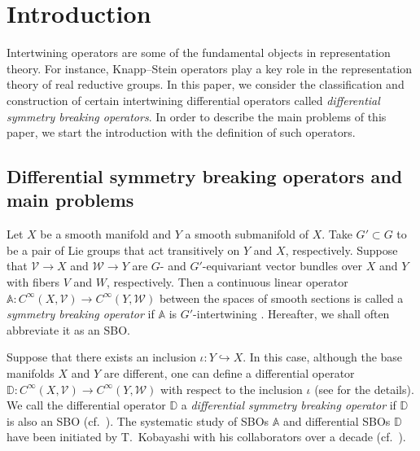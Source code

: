 \documentclass[reqno,11pt]{amsart}
\theoremstyle{remark}
\theoremstyle{definition}
\numberwithin{equation}{section}
\newcommand{\bD}{\mathbb{D}}
\newcommand{\bA}{\mathbb{A}}
\begin{document}
\setcounter{tocdepth}{1}
\tableofcontents


\section{Introduction}
\label{sec:intro}


Intertwining operators are some of the fundamental objects in representation theory. For instance, Knapp--Stein operators play a key role in the representation theory of real reductive groups. In this paper,  we consider the classification and 
construction of
certain intertwining differential operators called 
\emph{differential symmetry breaking operators}.
In order to describe the main problems of this paper,
we start the introduction with the definition of such operators.

\subsection{Differential symmetry breaking operators and main problems}

Let $X$ be a smooth manifold and $Y$ a smooth submanifold of $X$.
Take $G' \subset G$ to be a pair of Lie groups that act transitively 
on $Y$ and $X$, respectively.
Suppose that 
$\mathcal{V}\to X$ and $\mathcal{W}\to Y$ are
$G$- and $G'$-equivariant 
vector bundles over $X$ and $Y$ with fibers $V$ and $W$, respectively.
Then a continuous linear operator 
 $\bA \colon C^\infty(X,\mathcal{V}) \to C^\infty(Y,\mathcal{W})$ between
the spaces of smooth sections is called
a \emph{symmetry breaking operator}
if $\bA$ is  $G'$-intertwining \cite{KS15}. 
Hereafter, we shall often abbreviate it as an SBO.

Suppose  that there exists an inclusion
$\iota \colon Y \hookrightarrow X$. In this case, although the base manifolds
$X$ and $Y$ are different, one can define a differential operator 
$\bD\colon C^\infty(X,\mathcal{V}) \to C^\infty(Y,\mathcal{W})$
with respect to the inclusion  $\iota$
(see \cite{KP1} for the details).
We call the differential operator $\bD$
a \emph{differential symmetry breaking operator} 
if $\bD$ is also an SBO (cf.\ \cite{Kobayashi13, Kobayashi14, KP1, KOSS15}). 
The systematic study of SBOs $\bA$ and differential SBOs $\bD$ 
have been initiated by 
T.\ Kobayashi with his collaborators over a decade
(cf.\ \cite{Kobayashi13, Kobayashi14, KKP16, KP1, KP2, KOSS15, KS15, KS18}).
\end{document}
